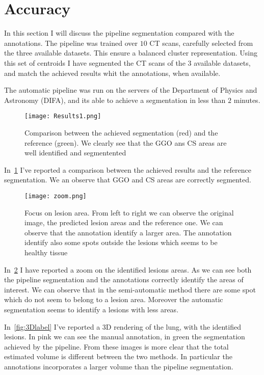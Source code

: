 \documentclass{standalone}
\begin{document}
	
	\section{Accuracy}
	
	
	In this section I will discuss the pipeline segmentation compared with the annotations. 
	The pipeline was trained over $10$ CT scans, carefully selected from the three available datasets. This ensure a balanced cluster representation. 
	Using this set of centroids I have segmented the CT scans of the $3$ available datasets, and match the  achieved results whit the annotations, when available.
	
	The automatic pipeline was run on the servers of the Department of Physics and Astronomy (DIFA), and its able to achieve a segmentation in less than $2$ minutes. 
	
	\begin{figure}[h!]
		\centering 
			\texttt{[image: Results1.png]}
			\caption{Comparison between the achieved segmentation (red) and the reference (green). We clearly see that the GGO ans CS areas are well identified and segmentented}\label{fig:Results}
	\end{figure}

	In \figurename\,\ref{fig:Results} I've reported a comparison between the achieved results and the reference segmentation. We an observe that GGO and CS areas are correctly segmented. 
	
	\begin{figure}[h!]
		\centering
			\texttt{[image: zoom.png]}
			\caption{Focus on lesion area. From left to right we can observe the original image, the predicted lesion areas and the reference one. We can observe that the annotation  identify a larger area. The annotation identify also some spots outside the lesions which seems to be healthy tissue}\label{fig:zoom}
	\end{figure}
	
	
	In \figurename\,\ref{fig:zoom} I have reported a zoom on the identified lesions areas. As we can see both the pipeline segmentation and the annotations correctly identify the areas of interest. We can observe that in the semi-automatic method there are some spot which do not seem to belong to a lesion area. Moreover the automatic segmentation seems to identify a lesions with less areas.
	
	
	In \figurename\,\ref{fig:3Dlabel} I've reported a 3D rendering of the lung, with the identified lesions. In pink we can see the manual annotation, in green the segmentation achieved by the pipeline. From these images is more clear that the total estimated volume is different between the two methods. In particular the annotations incorporates a larger volume than the pipeline segmentation.
	
\end{document}
